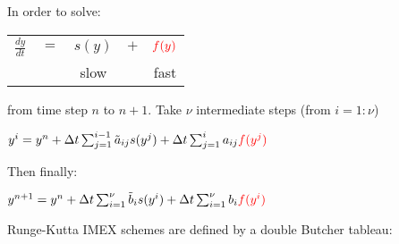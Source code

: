 \begin{slide}

In order to solve:

\begin{center}
\begin{tabular}{ccccc}
$\frac{dy}{dt}$ & $=$ & $s(y)$ & $+$ & $\color{red}f(y)$\\
                &     & slow &     & \color{red}fast
\end{tabular}
\end{center}
from time step $n$ to $n+1$. \pauseHS
Take $\nu$ intermediate steps (from $i=1:\nu$)
\begin{center}
$y^i = y^n + \Delta t \sum_{j=1}^{i-1} \tilde{a}_{ij} s(y^j)
           + \Delta t \sum_{j=1}^{i} a_{ij} \color{red}f(y^j)$
\end{center}\pauseHS
Then finally:
\begin{center}
$y^{n+1} = y^n + \Delta t \sum_{i=1}^{\nu} \tilde{b}_{i} s(y^i)
               + \Delta t \sum_{i=1}^{\nu} b_{i} \color{red}f(y^i)$
\end{center}
\pauseHS
Runge-Kutta IMEX schemes are defined by a double Butcher tableau:


\end{slide}
